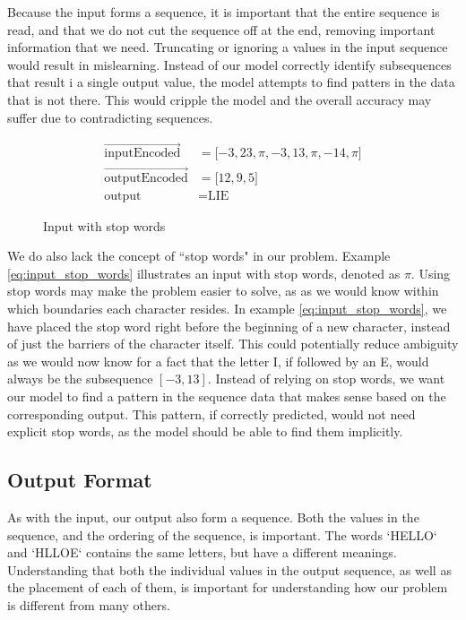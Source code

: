 Because the input forms a sequence, it is important that the entire sequence is read, and that we do not cut the sequence off at the end, removing important information that we need. Truncating or ignoring a values in the input sequence would result in mislearning. Instead of our model correctly identify subsequences that result i a single output value, the model attempts to find patters in the data that is not there. This would cripple the model and the overall accuracy may suffer due to contradicting sequences.

\begin{figure}[h]
    \begin{equation}
        \label{eq:input_stop_words}
        \begin{aligned}
           \vec{\text{inputEncoded}}                &= \lbrack -3, 23, \pi, -3, 13, \pi, -14, \pi \rbrack \\
           \vec{\text{outputEncoded}}               &= \lbrack 12, 9, 5 \rbrack \\
           \text{output}                            &= \text{LIE}
        \end{aligned}
    \end{equation}
    \captionsetup{labelformat=empty}
    \caption{Input with stop words}
\end{figure}

We do also lack the concept of ``stop words" in our problem. Example \ref{eq:input_stop_words} illustrates an input with stop words, denoted as $\pi$. Using stop words may make the problem easier to solve, as as we would know within which boundaries each character resides. In example \ref{eq:input_stop_words}, we have placed the stop word right before the beginning of a new character, instead of just the barriers of the character itself. This could potentially reduce ambiguity as we would now know for a fact that the letter I, if followed by an E, would always be the subsequence \([-3, 13]\). Instead of relying on stop words, we want our model to find a pattern in the sequence data that makes sense based on the corresponding output. This pattern, if correctly predicted, would not need explicit stop words, as the model should be able to find them implicitly.

\subsection{Output Format}
As with the input, our output also form a sequence. Both the values in the sequence, and the ordering of the sequence, is important. The words `HELLO` and `HLLOE` contains the same letters, but have a different meanings. Understanding that both the individual values in the output sequence, as well as the placement of each of them, is important for understanding how our problem is different from many others.

